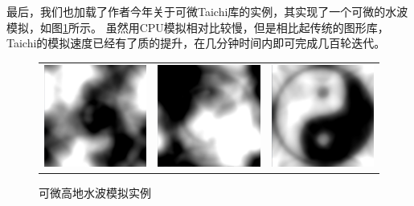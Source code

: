 \documentclass[thesis]{thesis}
\begin{document}
最后，我们也加载了作者今年关于可微Taichi库\cite{hu_difftaichi_2019}的实例，其实现了一个可微的水波模拟，如图\ref{fig:difftaichi}所示。
虽然用CPU模拟相对比较慢，但是相比起传统的图形库，Taichi的模拟速度已经有了质的提升，在几分钟时间内即可完成几百轮迭代。
\begin{figure}[!ht]
\centering
\begin{tabular}{ccc}
\includegraphics[width=0.33\linewidth]{fig/wave1.png}&
\includegraphics[width=0.33\linewidth]{fig/wave2.png}&
\includegraphics[width=0.33\linewidth]{fig/wave3.png}
\end{tabular}
\caption{可微高地水波模拟实例\protect\footnotemark}
\label{fig:difftaichi}
\end{figure}
\end{document}
